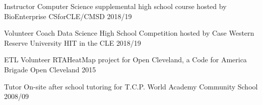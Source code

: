 

\begin{cvhonors}

  \cvhonor
    {Instructor} %
    {Computer Science supplemental high school course hosted by BioEnterprise} %
    {CSforCLE/CMSD} %
    {2018/19} %

  \cvhonor
    {Volunteer Coach} %
    {Data Science High School Competition hosted by Case Western Reserve University} %
    {HIT in the CLE} %
    {2018/19} %

  \cvhonor
    {ETL Volunteer} %
    {RTAHeatMap project for Open Cleveland, a Code for America Brigade} %
    {Open Cleveland} %
    {2015} %

  \cvhonor
    {Tutor} %
    {On-site after school tutoring for T.C.P. World Academy} %
    {Community School} %
    {2008/09} %

\end{cvhonors}
